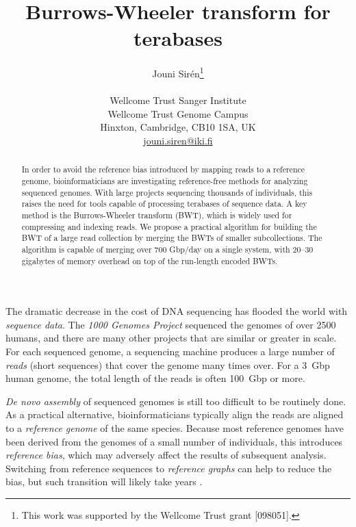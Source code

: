 \documentclass[smallabstract,smallcaptions]{dccpaper}
\begin{document}
\title
{\large
\textbf{Burrows-Wheeler transform for terabases}
}


\author{%
Jouni Sirén\thanks{This work was supported by the Wellcome Trust grant [098051].} \\[0.5em]
{\small\begin{minipage}{\linewidth}\begin{center}
\begin{tabular}{c}
Wellcome Trust Sanger Institute \\
Wellcome Trust Genome Campus \\
Hinxton, Cambridge, CB10 1SA, UK \\
\url{jouni.siren@iki.fi}
\end{tabular}
\end{center}\end{minipage}}
}


\maketitle
\thispagestyle{empty}


\begin{abstract}
In order to avoid the reference bias introduced by mapping reads to a reference genome, bioinformaticians are investigating reference-free methods for analyzing sequenced genomes. With large projects sequencing thousands of individuals, this raises the need for tools capable of processing terabases of sequence data. A key method is the Burrows-Wheeler transform (BWT), which is widely used for compressing and indexing reads. We propose a practical algorithm for building the BWT of a large read collection by merging the BWTs of smaller subcollections. The algorithm is capable of merging over 700 Gbp/day on a single system, with 20--30 gigabytes of memory overhead on top of the run-length encoded BWTs.
\end{abstract}



The dramatic decrease in the cost of DNA sequencing has flooded the world with \emph{sequence data}. The \emph{1000 Genomes Project} \cite{1000GP2015} sequenced the genomes of over 2500 humans, and there are many other projects that are similar or greater in scale. For each sequenced genome, a sequencing machine produces a large number of \emph{reads} (short sequences) that cover the genome many times over. For a 3~Gbp human genome, the total length of the reads is often 100~Gbp or more.

\emph{De novo assembly} of sequenced genomes is still too difficult to be routinely done. As a practical alternative, bioinformaticians typically align the reads are aligned to a \emph{reference genome} of the same species. Because most reference genomes have been derived from the genomes of a small number of individuals, this introduces \emph{reference bias}, which may adversely affect the results of subsequent analysis. Switching from reference sequences to \emph{reference graphs} can help to reduce the bias, but such transition will likely take years \cite{Church2015}.
\end{document}
